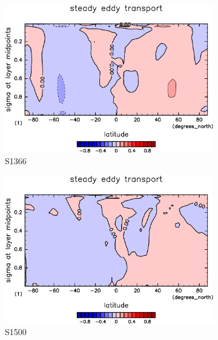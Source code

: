 \documentclass[body]{subfiles}
\begin{document}
\begin{figure}[t]
	\centering
	\begin{subfigure}{.4\textwidth}
		\centering
		\includegraphics[width=\textwidth]{S1366/MeriHeatTransTest@dryStatEn_SE,time=14600:14965-crop-rotate.pdf}
		\caption{S1366}\label{乾燥静的エネルギー停滞性擾乱S1366}
	\end{subfigure}
	\begin{subfigure}{.4\textwidth}
		\centering
		\includegraphics[width=\textwidth]{S1500/MeriHeatTransTest@dryStatEn_SE,time=3650:4015-crop-rotate.pdf}
		\caption{S1500}\label{乾燥静的エネルギー停滞性擾乱S1500}
	\end{subfigure}
	\begin{subfigure}{.4\textwidth}
		\centering

\end{subfigure}
\end{figure}
\end{document}
